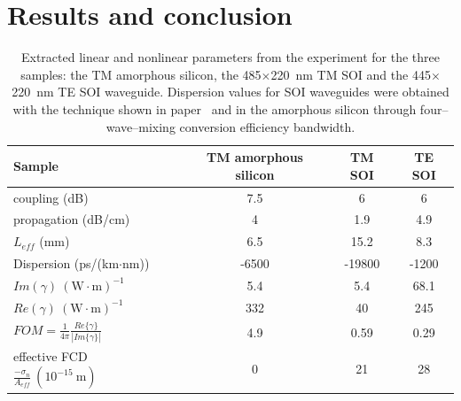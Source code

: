 \documentclass[10pt,letterpaper]{article}
\begin{document}
\section{Results and conclusion}

\begin{table}
\centering
\caption{Extracted linear and nonlinear parameters from the experiment for the three samples: the TM amorphous silicon, the 485$\times$220~nm TM SOI and the 445$\times$220~nm TE SOI waveguide. Dispersion values for SOI waveguides were obtained with the technique shown in paper~\cite{Mas2012} and in the amorphous silicon through four--wave--mixing conversion efficiency bandwidth.}
\begin{tabular}{l|ccc}
\hline
Sample & TM amorphous silicon & TM SOI & TE SOI \\\hline
coupling (dB) & 7.5 & 6 & 6\\
propagation (dB/cm) & 4 & 1.9 & 4.9\\
$L_{eff}$ (mm) & 6.5 & 15.2 & 8.3\\
 Dispersion  (ps/(km$\cdot$nm))   & -6500 & -19800 & -1200\\
  $ Im(\gamma)~(\mathrm{W}\cdot \mathrm{m})^{-1} $     & 5.4 & 5.4 & 68.1\\
    $ Re(\gamma)~(\mathrm{W}\cdot \mathrm{m})^{-1} $        & 332 & 40 & 245\\
$ FOM = \frac{1}{4\pi} \frac{Re\{\gamma\}}{|Im\{\gamma\}|} $  & 4.9 & 0.59 & 0.29 \\
 effective FCD $ \frac{-\sigma_n}{ A_{eff} }~(10^{-15}~\mathrm{m}) $ & 0 & 21 & 28 \\
\hline
\end{tabular}
\label{table:results}
\end{table}




\end{document}
